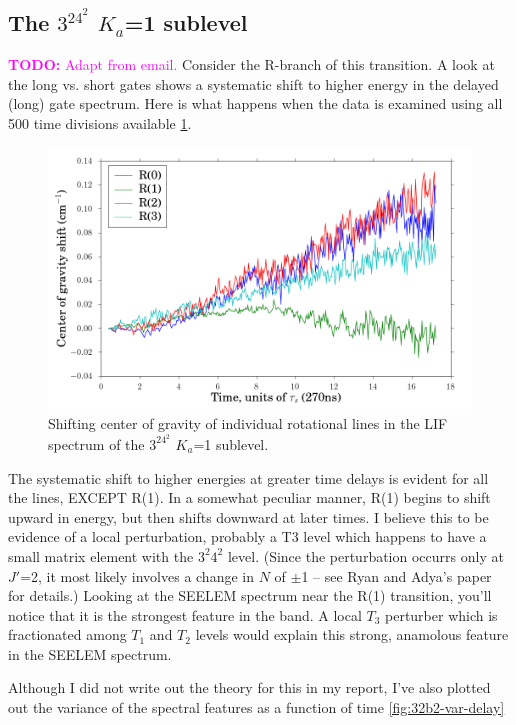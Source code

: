 \documentclass[12pt]{mitthesis}
\newcommand{\TODO} [1]{\textcolor{magenta}{\textbf{TODO:} #1}}
\begin{document}
\subsection{The $3^24^2$ $K_a$=1 sublevel}

\TODO{Adapt from email.}  Consider the R-branch of this transition.  A
look at the long vs. short gates shows a systematic shift to higher
energy in the delayed (long) gate spectrum.  Here is what happens when
the data is examined using all 500 time divisions available
\ref{fig:32b2-cog-delay}.

\begin{figure}
  \caption{Shifting center of gravity of individual rotational
    lines in the LIF spectrum of the $3^24^2$ $K_a$=1 sublevel.}
  \label{fig:32b2-cog-delay}
  \centering
  \includegraphics[width=6in]{32b2-cog-delay.png}
\end{figure}

The systematic shift to higher energies at greater time delays is
evident for all the lines, EXCEPT R(1).  In a somewhat peculiar
manner, R(1) begins to shift upward in energy, but then shifts
downward at later times. I believe this to be evidence of a local
perturbation, probably a T3 level which happens to have a small matrix
element with the $3^2 4^2$ level.  (Since the perturbation occurrs
only at $J'$=2, it most likely involves a change in $N$ of $\pm$1 --
see Ryan and Adya's paper for details.)  Looking at the SEELEM
spectrum near the R(1) transition, you'll notice that it is the
strongest feature in the band.  A local $T_3$ perturber which is
fractionated among $T_1$ and $T_2$ levels would explain this strong,
anamolous feature in the SEELEM spectrum.

Although I did not write out the theory for this in my report, I've
also plotted out the variance of the spectral features as a function
of time \ref{fig:32b2-var-delay}
\end{document}
